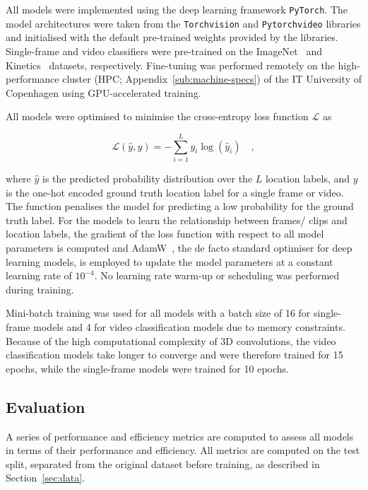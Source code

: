 \documentclass[a4paper]{article}
\begin{document}
All models were implemented using the deep learning framework \texttt{PyTorch}.
The model architectures were taken from the \texttt{Torchvision} and
\texttt{Pytorchvideo} libraries and initialised with the default pre-trained
weights provided by the libraries. Single-frame and video classifiers were
pre-trained on the ImageNet~\cite{imagenet} and Kinetics~\cite{kinetics}
datasets, respectively. Fine-tuning was performed remotely on the
high-performance cluster (HPC; Appendix~\ref{sub:machine-specs}) of the IT
University of Copenhagen using GPU-accelerated training. 

All models were optimised to minimise the cross-entropy loss function
$\mathcal{L}$ as

\begin{equation}
  \mathcal{L}(\hat{y},y) = -\sum_{i=1}^{L} y_i
  \log(\hat{y}_i) \quad ,
  \label{eq:cross-entropy}
\end{equation}



where $\hat{y}$ is the predicted probability distribution over the $L$
location labels, and $y$ is the one-hot encoded ground truth location
label for a single frame or video. The function penalises the model for
predicting a low probability for the ground truth label. For the models to learn
the relationship between frames/ clips and location labels, the gradient of the
loss function with respect to all model parameters is computed and
AdamW~\cite{adamw}, the de facto standard optimiser for deep learning models, is
employed to update the model parameters at a constant learning rate of
$10^{-4}$. No learning rate warm-up or scheduling was performed during training.

Mini-batch training was used for all models with a batch size of 16 for
single-frame models and 4 for video classification models due to memory
constraints. Because of the high computational complexity of 3D convolutions,
the video classification models take longer to converge and were therefore
trained for 15 epochs, while the single-frame models were trained for 10 epochs.

\subsection{Evaluation} %
\label{sub:evaluation}

A series of performance and efficiency metrics are computed to assess all models
in terms of their performance and efficiency. All metrics are computed on the
test split, separated from the original dataset before training, as
described in Section~\ref{sec:data}.
\end{document}
